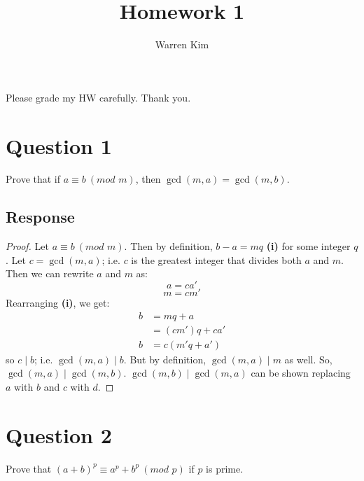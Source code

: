 \documentclass[13pt]{article}
\title{Homework 1}
\author{Warren Kim}
\begin{document}
\maketitle

\begin{center}Please grade my HW carefully. Thank you.\end{center}

\newpage
\section*{Question 1}
Prove that if $a \equiv b \ (\textit{mod } m)$, then $\gcd(m, a) = \gcd(m, b)$.

\subsection*{Response}
\begin{proof}
  Let $a \equiv b \ (\textit{mod } m)$. Then by definition, $b - a = mq$ \textbf{(i)} for some integer
  $q$. Let $c = \gcd(m, a)$; i.e. $c$ is the greatest integer that divides both $a$ and $m$. Then we
  can rewrite $a$ and $m$ as:
  \[a = ca'\]
  \[m = cm'\]
  Rearranging \textbf{(i)}, we get:
  \begin{align*}
    b &= mq + a \\
      &= (cm')q + ca' \\
    b &= c(m'q + a')
  \end{align*}
  so $c \mid b$; i.e. $\gcd(m, a) \mid b$. But by definition, $\gcd(m, a) \mid m$ as well. So,
  $\gcd(m, a) \mid \gcd(m, b)$. $\gcd(m, b) \mid \gcd(m, a)$ can be shown replacing $a$ with $b$ and
  $c$ with $d$.
\end{proof}





\newpage
\section*{Question 2}
Prove that $(a + b)^p \equiv a^p + b^p \ (\textit{mod } p)$ if $p$ is prime.
\end{document}
